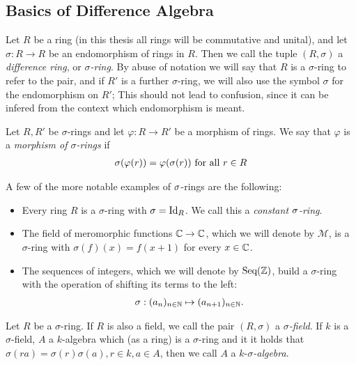 \subsection{Basics of Difference Algebra}\label{fundamentos}
\begin{defn}
Let  $R$ be a ring (in this thesis all rings will be commutative and unital), and let
 $\sigma: R \rightarrow R$ be an endomorphism of rings in $R$. Then we call the tuple $(R,\sigma)$ a \emph{difference ring}, or $\sigma$\emph{-ring}. 
By abuse of notation we will say that $R$ is a $\sigma$-ring  to refer to the pair, and if $R'$ is a further $\sigma$-ring, we will also use the symbol $\sigma$ for the endomorphism on $R'$; This should not lead to confusion, since it can be infered from the context which endomorphism is meant. 
\end{defn}

\begin{defn}
Let $R, R'$ be  $\sigma$-rings and let $\varphi: R \rightarrow R'$ be a morphism of rings. We say that $\varphi$ is a \emph{morphism of $\sigma$-rings}  if 
\begin{align*}
\sigma(\varphi(r)) = \varphi(\sigma(r)) \text{ for all } r \in R
\end{align*}
\end{defn}

\begin{ex} A few of the more notable examples of $\sigma$-rings are the following:

\begin{itemize}
\item Every ring $R$ is a $\sigma$-ring with $\sigma = \text{Id}_R$. We call this a \emph{constant $\sigma$-ring}.  
\item The field of meromorphic functions $\mathbb{C} \rightarrow \mathbb{C}$, which we will denote by $\mathcal{M}$,
is a $\sigma$-ring with $\sigma(f)(x) = f(x+1)$ for every $x \in \mathbb{C}$.
\item The sequences of integers, which we will denote by $\text{Seq}(\mathbb{Z})$, build a $\sigma$-ring with the operation of shifting its terms to the left:
\begin{align*} \sigma: (a_n)_{n \in \mathbb{N}} \mapsto (a_{n+1})_{n \in \mathbb{N}}. \end{align*}
\end{itemize}
\end{ex}

\begin{defn}
Let $R$ be a $\sigma$-ring. If $R$ is also a field, we call the pair $(R,\sigma)$ a $\sigma$\emph{-field}.  
If $k$ is a $\sigma$-field, $A$ a $k$-algebra which (as a ring) is a $\sigma$-ring and it it holds that 
$\sigma(ra) = \sigma(r) \sigma(a), r \in k, a \in A$, then we call $A$ a  $k$-$\sigma$\emph{-algebra}. 
\end{defn}

